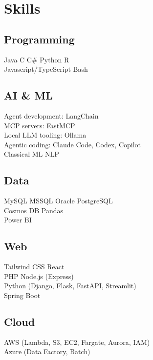 \documentclass[]{plushcv}
\begin{document}
\begin{minipage}[t]{0.25\textwidth}
\renewcommand{\sectionsep}{\vspace{2pt}}


\section{Skills}
\subsection{Programming}
\sectionsep
Java \textbullet{} C \textbullet{} C\# \textbullet{} Python \textbullet{} R \textbullet{} \\
Javascript/TypeScript \textbullet{} Bash
\sectionsep

\subsection{AI \& ML}
\sectionsep
Agent development: LangChain \\
MCP servers: FastMCP \\
Local LLM tooling: Ollama \\
Agentic coding: Claude Code, Codex, Copilot \\
Classical ML \textbullet{} NLP
\sectionsep

\subsection{Data}
\sectionsep
MySQL \textbullet{} MSSQL \textbullet{} Oracle \textbullet{} PostgreSQL \textbullet{} \\
Cosmos DB \textbullet{} Pandas \textbullet{} \\ Power BI
\sectionsep

\subsection{Web}
\sectionsep
Tailwind CSS \textbullet{} React \textbullet{}  \\
PHP \textbullet{} Node.js (Express) \textbullet{}  \\
Python (Django, Flask, FastAPI, Streamlit) \textbullet{} \\
Spring Boot
\sectionsep

\subsection{Cloud}
\sectionsep
AWS (Lambda, S3, EC2, \mbox{Fargate}, Aurora, IAM) \\
Azure (Data Factory, Batch)
\sectionsep


\end{minipage}
\end{document}
